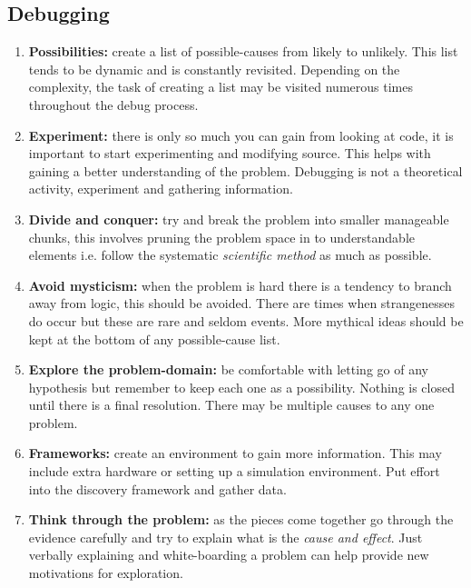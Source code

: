 \subsection{Debugging}

\begin{enumerate}

\item \textbf{Possibilities:} create a list of possible-causes from likely to unlikely. This list tends to be dynamic and is constantly revisited. Depending on the complexity, the task of creating a list may be visited numerous times throughout the debug process.

\item \textbf{Experiment:} there is only so much you can gain from looking at code, it is important to start experimenting and modifying source. This helps with gaining a better understanding of the problem. Debugging is not a theoretical activity, experiment and gathering information.

\item \textbf{Divide and conquer:} try and break the problem into smaller manageable chunks, this involves pruning the problem space in to understandable elements i.e. follow the systematic \textit{scientific method} as much as possible.

\item \textbf{Avoid mysticism:} when the problem is hard there is a tendency to branch away from logic, this should be avoided. There are times when strangenesses do occur but these are rare and seldom events. More mythical ideas should be kept at the bottom of any possible-cause list.

\item \textbf{Explore the problem-domain:} be comfortable with letting go of any hypothesis but remember to keep each one as a possibility. Nothing is closed until there is a final resolution. There may be multiple causes to any one problem.

\item \textbf{Frameworks:} create an environment to gain more information. This may include extra hardware or setting up a simulation environment. Put effort into the discovery framework and gather data. 

\item \textbf{Think through the problem:} as the pieces come together go through the evidence carefully and try to explain what is the \textit{cause and effect}. Just verbally explaining and white-boarding a problem can help provide new motivations for exploration.


\end{enumerate}
